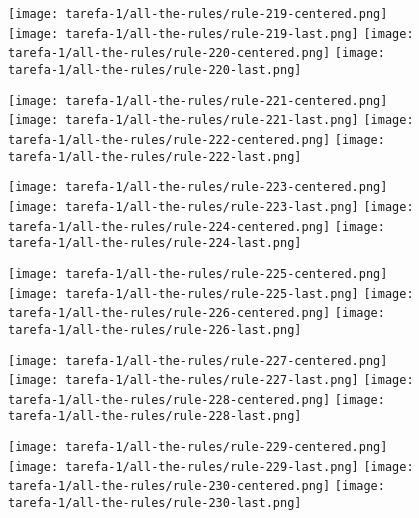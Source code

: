 \begin{figure}[htbp]
  \centering
\texttt{[image: tarefa-1/all-the-rules/rule-219-centered.png]}
\texttt{[image: tarefa-1/all-the-rules/rule-219-last.png]}
\texttt{[image: tarefa-1/all-the-rules/rule-220-centered.png]}
\texttt{[image: tarefa-1/all-the-rules/rule-220-last.png]}
\end{figure}
\begin{figure}[htbp]
  \centering
\texttt{[image: tarefa-1/all-the-rules/rule-221-centered.png]}
\texttt{[image: tarefa-1/all-the-rules/rule-221-last.png]}
\texttt{[image: tarefa-1/all-the-rules/rule-222-centered.png]}
\texttt{[image: tarefa-1/all-the-rules/rule-222-last.png]}
\end{figure}
\begin{figure}[htbp]
  \centering
\texttt{[image: tarefa-1/all-the-rules/rule-223-centered.png]}
\texttt{[image: tarefa-1/all-the-rules/rule-223-last.png]}
\texttt{[image: tarefa-1/all-the-rules/rule-224-centered.png]}
\texttt{[image: tarefa-1/all-the-rules/rule-224-last.png]}
\end{figure}
\begin{figure}[htbp]
  \centering
\texttt{[image: tarefa-1/all-the-rules/rule-225-centered.png]}
\texttt{[image: tarefa-1/all-the-rules/rule-225-last.png]}
\texttt{[image: tarefa-1/all-the-rules/rule-226-centered.png]}
\texttt{[image: tarefa-1/all-the-rules/rule-226-last.png]}
\end{figure}
\begin{figure}[htbp]
  \centering
\texttt{[image: tarefa-1/all-the-rules/rule-227-centered.png]}
\texttt{[image: tarefa-1/all-the-rules/rule-227-last.png]}
\texttt{[image: tarefa-1/all-the-rules/rule-228-centered.png]}
\texttt{[image: tarefa-1/all-the-rules/rule-228-last.png]}
\end{figure}
\begin{figure}[htbp]
  \centering
\texttt{[image: tarefa-1/all-the-rules/rule-229-centered.png]}
\texttt{[image: tarefa-1/all-the-rules/rule-229-last.png]}
\texttt{[image: tarefa-1/all-the-rules/rule-230-centered.png]}
\texttt{[image: tarefa-1/all-the-rules/rule-230-last.png]}
\end{figure}
